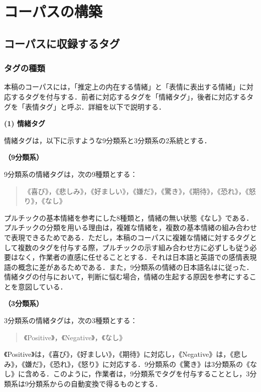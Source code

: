 \documentclass[japanese]{jnlp_1.3c}
\begin{document}
\section{コーパスの構築}

\subsection{コーパスに収録するタグ}

\subsubsection{タグの種類}

本稿のコーパスには，「推定上の内在する情緒」と「表情に表出する情緒」に対応するタグを付与する．前者に対応するタグを「情緒タグ」，後者に対応するタグを「表情タグ」と呼ぶ．詳細を以下で説明する．

\noindent
{\bf (1) 情緒タグ}

情緒タグは，以下に示すような9分類系と3分類系の2系統とする．

\noindent
{\bf （9分類系）}

9分類系の情緒タグは，次の9種類とする：
\begin{quote}
《喜び》，《悲しみ》，《好ましい》，《嫌だ》，《驚き》，《期待》，《恐れ》，《怒り》，《なし》
\end{quote}

プルチックの基本情緒\cite{Plutchik60}を参考にした8種類と，情緒の無い状態《なし》である．プルチックの分類を用いる理由は，複雑な情緒を，複数の基本情緒の組み合わせで表現できるためである．ただし，本稿のコーパスに複雑な情緒に対するタグとして複数のタグを付与する際，プルチックの示す組み合わせ方に必ずしも従う必要はなく，作業者の直感に任せることとする．それは日本語と英語での感情表現語の概念に差があるためである．また，9分類系の情緒の日本語名は\cite{徳久&岡田98}に従った．情緒タグの付与において，判断に悩む場合，情緒の生起する原因を参考にすることを意図している．

\noindent
{\bf （3分類系）}

3分類系の情緒タグは，次の3種類とする：
\begin{quote}
《Positive》，《Negative》，《なし》
\end{quote}

《Positive》は，《喜び》，《好ましい》，《期待》に対応し，《Negative》は，《悲しみ》，《嫌だ》，《恐れ》，《怒り》に対応する．9分類系の《驚き》は3分類系の《なし》に含める．このように，作業者は，9分類系でタグを付与することとし，3分類系は9分類系からの自動変換で得るものとする．
\end{document}
